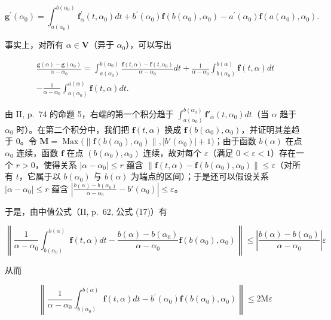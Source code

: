 \[
\mathbf {g} ^ {\prime} (\alpha_ {0}) = \int_ {a (\alpha_ {0})} ^ {b (\alpha_ {0})} \mathbf {f} _ {\alpha} ^ {\prime} (t, \alpha_ {0}) d t + b ^ {\prime} (\alpha_ {0}) \mathbf {f} (b (\alpha_ {0}), \alpha_ {0}) - a ^ {\prime} (\alpha_ {0}) \mathbf {f} (a (\alpha_ {0}), \alpha_ {0}).\tag{13}
\]

事实上，对所有 \(\alpha \in \mathbf{V}\)（异于 \(\alpha_0\)），可以写出

\[
\begin{array}{c} \frac {\mathbf {g} (\alpha) - \mathbf {g} (\alpha_ {0})}{\alpha - \alpha_ {0}} = \int_ {a (\alpha_ {0})} ^ {b (\alpha_ {0})} \frac {\mathbf {f} (t , \alpha) - \mathbf {f} (t , \alpha_ {0})}{\alpha - \alpha_ {0}} d t + \frac {1}{\alpha - \alpha_ {0}} \int_ {b (\alpha_ {0})} ^ {b (\alpha)} \mathbf {f} (t, \alpha) d t \\ - \frac {1}{\alpha - \alpha_ {0}} \int_ {a (\alpha_ {0})} ^ {a (\alpha)} \mathbf {f} (t, \alpha) d t. \end{array}
\]

由 II, p.~74 的命题 5，右端的第一个积分趋于 \(\int_{a(\alpha_0)}^{b(\alpha_0)} \mathbf{f}'_\alpha(t, \alpha_0) dt\)（当 \(\alpha\) 趋于 \(\alpha_0\) 时）。在第二个积分中，我们把 \(\mathbf{f}(t, \alpha)\) 换成 \(\mathbf{f}(b(\alpha_0), \alpha_0)\)，并证明其差趋于 0。令 \(\mathbf{M} = \operatorname{Max}\big( \| \mathbf{f}(b(\alpha_0), \alpha_0) \|, |b'(\alpha_0)| + 1 \big)\)；由于函数 \(b(\alpha)\) 在点 \(\alpha_0\) 连续，函数 \(\mathbf{f}\) 在点 \((b(\alpha_0), \alpha_0)\) 连续，故对每个 \(\varepsilon\)（满足 \(0 < \varepsilon < 1\)）存在一个 \(r > 0\)，使得关系 \(|\alpha - \alpha_0| \leqslant r\) 蕴含 \(\| \mathbf{f}(t, \alpha) - \mathbf{f}(b(\alpha_0), \alpha_0) \| \leqslant \varepsilon\)（对所有 \(t\)，它属于以 \(b(\alpha_0)\) 与 \(b(\alpha)\) 为端点的区间）；于是还可以假设关系 \(|\alpha - \alpha_0| \leqslant r\) 蕴含 \(\left| \frac{b(\alpha) - b(\alpha_0)}{\alpha - \alpha_0} - b'(\alpha_0) \right| \leqslant \varepsilon\)。

于是，由中值公式（II, p.~62, 公式 (17)）有

\[
\left\| \frac {1}{\alpha - \alpha_ {0}} \int_ {b (\alpha_ {0})} ^ {b (\alpha)} \mathbf {f} (t, \alpha) d t - \frac {b (\alpha) - b (\alpha_ {0})}{\alpha - \alpha_ {0}} \mathbf {f} (b (\alpha_ {0}), \alpha_ {0}) \right\| \leqslant \left| \frac {b (\alpha) - b (\alpha_ {0})}{\alpha - \alpha_ {0}} \right| \varepsilon
\]

从而

\[
\left\| \frac {1}{\alpha - \alpha_ {0}} \int_ {b (\alpha_ {0})} ^ {b (\alpha)} \mathbf {f} (t, \alpha) d t - b ^ {\prime} (\alpha_ {0}) \mathbf {f} (b (\alpha_ {0}), \alpha_ {0}) \right\| \leqslant 2 \mathrm{M} \varepsilon
\]

